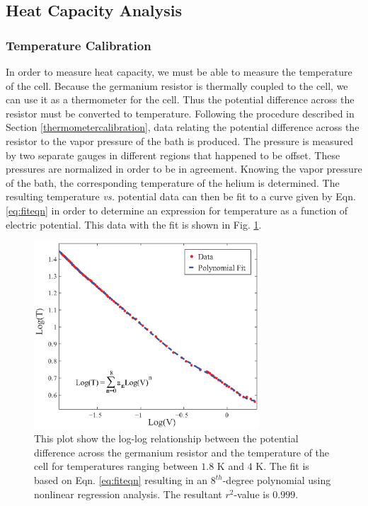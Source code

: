 \subsection{Heat Capacity Analysis}\label{heatcapacityanalysis}
\subsubsection{Temperature Calibration}\label{temperaturecalibration}

In order to measure heat capacity, we must be able to measure the temperature of the cell.  Because the germanium resistor is thermally coupled to the cell, we can use it as a thermometer for the cell.  Thus the potential difference across the resistor must be converted to temperature.  Following the procedure described in Section \ref{thermometercalibration}, data relating the potential difference across the resistor to the vapor pressure of the bath is produced.  The pressure is measured by two separate gauges in different regions that happened to be offset.  These pressures are normalized in order to be in agreement.  Knowing the vapor pressure of the bath, the corresponding temperature of the helium is determined. The resulting temperature \emph{vs.} potential data can then be fit to a curve given by Eqn. \ref{eq:fiteqn} in order to determine an expression for temperature as a function of electric potential.  This data with the fit is shown in Fig. \ref{fig:polyfit}.  
\begin{figure}[htbp]
\begin{center}
\includegraphics[height=70mm]{./figures/polyfit.eps}
\caption{\small{This plot show the log-log relationship between the potential difference across the germanium resistor and the temperature of the cell for temperatures ranging between $1.8$ K and $4$ K.  The fit is based on Eqn. \ref{eq:fiteqn} resulting in an $8^{th}$-degree polynomial using nonlinear regression analysis.  The resultant $r^{2}$-value is $0.999$.}}
\label{fig:polyfit}
\end{center}
\end{figure}

